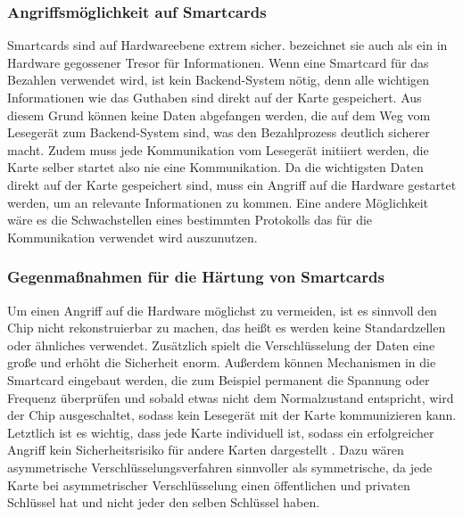 \subsubsection{Angriffsmöglichkeit auf Smartcards}
Smartcards sind auf Hardwareebene extrem sicher. \cite{refmas:ASSS} bezeichnet sie auch als ein in Hardware gegossener
Tresor für Informationen. Wenn eine Smartcard für das Bezahlen verwendet wird, ist kein Backend-System nötig,
denn alle wichtigen Informationen wie das Guthaben sind direkt auf der Karte gespeichert. Aus diesem Grund können
keine Daten abgefangen werden, die auf dem Weg vom Lesegerät zum Backend-System sind, was den Bezahlprozess
deutlich sicherer macht. Zudem muss jede Kommunikation vom Lesegerät initiiert werden, die Karte selber startet
also nie eine Kommunikation. Da die wichtigsten Daten direkt auf der Karte gespeichert sind, muss ein Angriff
auf die Hardware gestartet werden, um an relevante Informationen zu kommen. Eine andere Möglichkeit wäre es 
die Schwachstellen eines bestimmten Protokolls das für die Kommunikation verwendet wird auszunutzen.

\subsubsection{Gegenmaßnahmen für die Härtung von Smartcards}
Um einen Angriff auf die Hardware möglichst zu vermeiden, ist es sinnvoll den Chip nicht rekonstruierbar zu machen,
das heißt es werden keine Standardzellen oder ähnliches verwendet. Zusätzlich spielt die Verschlüsselung 
der Daten eine große und erhöht die Sicherheit enorm. Außerdem können Mechanismen in die Smartcard 
eingebaut werden, die zum Beispiel permanent die Spannung oder Frequenz überprüfen und sobald etwas
nicht dem Normalzustand entspricht, wird der Chip ausgeschaltet, sodass kein Lesegerät mit der 
Karte kommunizieren kann. Letztlich ist es wichtig, dass jede Karte individuell ist, sodass ein 
erfolgreicher Angriff kein Sicherheitsrisiko für andere Karten dargestellt \cite{refmas:ASSS}. 
Dazu wären asymmetrische Verschlüsselungsverfahren sinnvoller als symmetrische, da jede Karte bei
asymmetrischer Verschlüsselung einen öffentlichen und privaten Schlüssel hat und nicht jeder den
selben Schlüssel haben.




